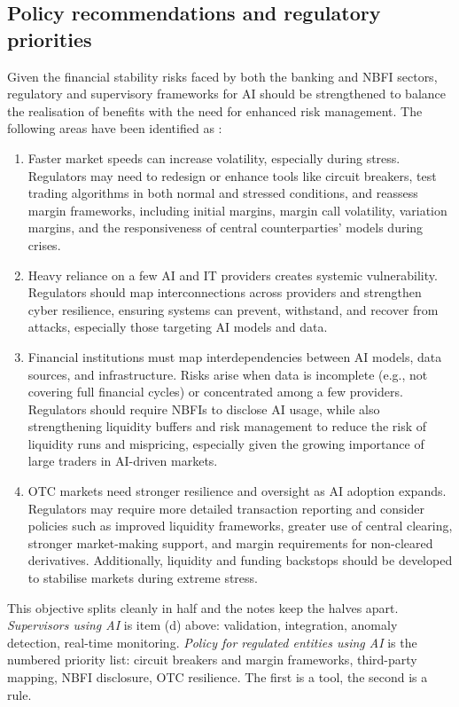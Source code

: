 \subsection*{Policy recommendations and regulatory priorities}

Given the financial stability risks faced by both the banking and NBFI sectors, regulatory
and supervisory frameworks for AI should be strengthened to balance the realisation of
benefits with the need for enhanced risk management. The following areas have been
identified as :

\begin{enumerate}
\item {} Faster market speeds can increase
volatility, especially during stress. Regulators may need to redesign or enhance tools like
circuit breakers, test trading algorithms in both normal and stressed conditions, and
reassess margin frameworks, including initial margins, margin call volatility, variation
margins, and the responsiveness of central counterparties' models during crises.
\item {} Heavy reliance on a few AI and IT
providers creates systemic vulnerability. Regulators should map interconnections across
providers and strengthen cyber resilience, ensuring systems can prevent, withstand, and
recover from attacks, especially those targeting AI models and data.
\item {} Financial institutions must map
interdependencies between AI models, data sources, and infrastructure. Risks arise when data
is incomplete (e.g., not covering full financial cycles) or concentrated among a few
providers. Regulators should require NBFIs to disclose AI usage, while also strengthening
liquidity buffers and risk management to reduce the risk of liquidity runs and mispricing,
especially given the growing importance of large traders in AI-driven markets.
\item {} OTC markets need stronger resilience and oversight as AI
adoption expands. Regulators may require more detailed transaction reporting and consider
policies such as improved liquidity frameworks, greater use of central clearing, stronger
market-making support, and margin requirements for non-cleared derivatives. Additionally,
liquidity and funding backstops should be developed to stabilise markets during extreme
stress.
\end{enumerate}

\begin{cikeybox}[title={Two actors, two verbs}]
This objective splits cleanly in half and the notes keep the halves apart. \emph{Supervisors
using AI} is item (d) above: validation, integration, anomaly detection, real-time
monitoring. \emph{Policy for regulated entities using AI} is the numbered priority list:
circuit breakers and margin frameworks, third-party mapping, NBFI disclosure, OTC resilience.
The first is a tool, the second is a rule.
\end{cikeybox}
